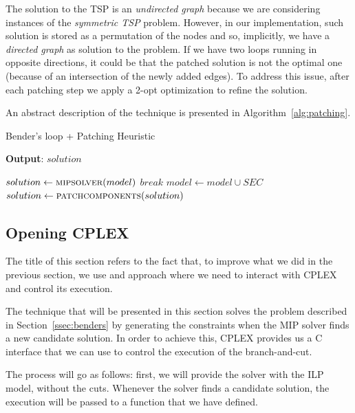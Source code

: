 \documentclass{article}
\begin{document}
The solution to the TSP is an \textit{undirected graph} because
we are considering instances of the \textit{symmetric TSP} problem.
However, in our implementation, such solution is stored as a permutation of the nodes and
so, implicitly, we have a \textit{directed graph} as solution to the problem.
If we have two loops running in opposite directions, it could be that the
patched solution is not the optimal one (because of an intersection of the newly added edges).
To address this issue, after each patching step we apply a 2-opt optimization to refine the solution.

An abstract description of the technique is presented in Algorithm~\ref{alg:patching}.

\begin{algorithm}[ht]
\caption{Bender's loop + Patching Heuristic}
\label{alg:patching}
\hspace*{0.5em} \textbf{Output}: $solution$
\begin{algorithmic}
                \State $solution \gets \Call{mipsolver}{model}$
                        \State $break$
                \EndIf
                \State $model \gets model \cup SEC$
                \State $solution \gets \Call{patchcomponents}{solution}$
        \EndWhile
\EndProcedure
\end{algorithmic}
\end{algorithm}

\subsection{Opening CPLEX}
\label{ssec:opening}
The title of this section refers to the fact that, to improve what we did in the
previous section, we use and approach where we need to interact with CPLEX and
control its execution.

The technique that will be presented in this section solves the problem
described in Section~\ref{ssec:benders} by generating the constraints when
the MIP solver finds a new candidate solution. In order to achieve this,
CPLEX provides us a C interface that we can use to control the execution
of the branch-and-cut.

The process will go as follows: first, we will provide the solver with the
ILP model, without the cuts. Whenever the solver finds a candidate solution,
the execution will be passed to a function that we have defined.
\end{document}
